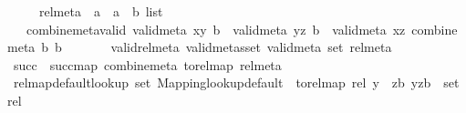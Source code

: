 \begin{isabellebody}
\ \ \ \ \ rel{\isacharunderscore}{\kern0pt}meta\ {\isacharcolon}{\kern0pt}{\isacharcolon}{\kern0pt}\ {\isachardoublequoteopen}{\isacharparenleft}{\kern0pt}{\isacharparenleft}{\kern0pt}{\isacharprime}{\kern0pt}a\ {\isasymtimes}\ {\isacharprime}{\kern0pt}a{\isacharparenright}{\kern0pt}\ {\isasymtimes}\ {\isacharprime}{\kern0pt}b{\isacharparenright}{\kern0pt}\ list{\isachardoublequoteclose}\isanewline
\ \ \ combine{\isacharunderscore}{\kern0pt}meta{\isacharunderscore}{\kern0pt}valid{\isacharcolon}{\kern0pt}\ {\isachardoublequoteopen}valid{\isacharunderscore}{\kern0pt}meta\ {\isacharparenleft}{\kern0pt}x{\isacharcomma}{\kern0pt}y{\isacharparenright}{\kern0pt}\ b{}\ {\isasymLongrightarrow}\ valid{\isacharunderscore}{\kern0pt}meta\ {\isacharparenleft}{\kern0pt}y{\isacharcomma}{\kern0pt}z{\isacharparenright}{\kern0pt}\ b{}\ {\isasymLongrightarrow}\ valid{\isacharunderscore}{\kern0pt}meta\ {\isacharparenleft}{\kern0pt}x{\isacharcomma}{\kern0pt}z{\isacharparenright}{\kern0pt}\ {\isacharparenleft}{\kern0pt}combine{\isacharunderscore}{\kern0pt}meta\ b{}\ b{}{\isacharparenright}{\kern0pt}{\isachardoublequoteclose}\isanewline
\ \ \ \ \ \ \ valid{\isacharunderscore}{\kern0pt}rel{\isacharunderscore}{\kern0pt}meta{\isacharcolon}{\kern0pt}\ {\isachardoublequoteopen}valid{\isacharunderscore}{\kern0pt}metas{\isacharunderscore}{\kern0pt}set\ valid{\isacharunderscore}{\kern0pt}meta\ {\isacharparenleft}{\kern0pt}set\ rel{\isacharunderscore}{\kern0pt}meta{\isacharparenright}{\kern0pt}{\isachardoublequoteclose}\isanewline
{}\isanewline
\isanewline
{}\isamarkupfalse%
\ {\isachardoublequoteopen}succ\ {\isasymequiv}\ succ{\isacharunderscore}{\kern0pt}map\ combine{\isacharunderscore}{\kern0pt}meta\ {\isacharparenleft}{\kern0pt}to{\isacharunderscore}{\kern0pt}rel{\isacharunderscore}{\kern0pt}map\ rel{\isacharunderscore}{\kern0pt}meta{\isacharparenright}{\kern0pt}{\isachardoublequoteclose}\isanewline
\isanewline
{}\isamarkupfalse%
\ rel{\isacharunderscore}{\kern0pt}map{\isacharunderscore}{\kern0pt}default{\isacharunderscore}{\kern0pt}lookup{\isacharcolon}{\kern0pt}\ {\isachardoublequoteopen}set\ {\isacharparenleft}{\kern0pt}Mapping{\isachardot}{\kern0pt}lookup{\isacharunderscore}{\kern0pt}default\ {\isacharbrackleft}{\kern0pt}{\isacharbrackright}{\kern0pt}\ {\isacharparenleft}{\kern0pt}to{\isacharunderscore}{\kern0pt}rel{\isacharunderscore}{\kern0pt}map\ rel{\isacharparenright}{\kern0pt}\ y{\isacharparenright}{\kern0pt}\ {\isacharequal}{\kern0pt}\ {\isacharbraceleft}{\kern0pt}{\isacharparenleft}{\kern0pt}z{\isacharcomma}{\kern0pt}b{\isacharparenright}{\kern0pt}{\isachardot}{\kern0pt}\ {\isacharparenleft}{\kern0pt}{\isacharparenleft}{\kern0pt}y{\isacharcomma}{\kern0pt}z{\isacharparenright}{\kern0pt}{\isacharcomma}{\kern0pt}b{\isacharparenright}{\kern0pt}\ {\isasymin}\ set\ rel{\isacharbraceright}{\kern0pt}{\isachardoublequoteclose}\isanewline

\end{isabellebody}
